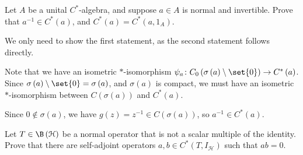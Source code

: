 \documentclass[10pt]{mypackage}
\begin{document}
\begin{exercise}
  Let $A$ be a unital $C^{\ast}$-algebra, and suppose $a\in A$ is normal and invertible. Prove that $a^{-1}\in C^{\ast}\left(a\right)$, and $C^{\ast}\left(a\right) = C^{\ast}\left(a,1_A\right)$.
\end{exercise}
\begin{solution}
  We only need to show the first statement, as the second statement follows directly.\newline

  Note that we have an isometric $\ast$-isomorphism $\psi_a\colon C_0\left(\sigma\left(a\right)\setminus \set{0}\right)\rightarrow C^{\ast}\left(a\right)$. Since $\sigma\left(a\right)\setminus \set{0} = \sigma\left(a\right)$, and $\sigma\left(a\right)$ is compact, we must have an isometric $\ast$-isomorphism between $C\left(\sigma\left(a\right)\right)$ and $C^{\ast}\left(a\right)$.\newline

  Since $0\notin \sigma\left(a\right)$, we have $g(z) = z^{-1}\in C\left(\sigma\left(a\right)\right)$, so $a^{-1}\in C^{\ast}\left(a\right)$.
\end{solution}
\begin{exercise}
  Let $T\in \B\left(\mathcal{H}\right)$ be a normal operator that is not a scalar multiple of the identity. Prove that there are self-adjoint operators $a,b\in C^{\ast}\left(T,I_{\mathcal{H}}\right)$ such that $ab = 0$.
\end{exercise}
\end{document}
